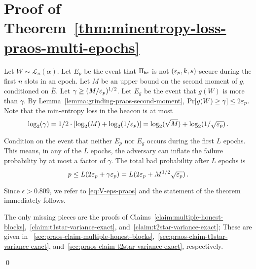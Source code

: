 \section{Proof of Theorem~\ref{thm:minentropy-loss-praos-multi-epochs}}\label{sec:thm-praos-multiepoch}\label{sec:proof-praos-theorem}

Let $W \sim \mathcal{L}_n(\alpha)$. 
Let $E_p$ be the event that 
$\Pi_\mathsf{bc}$ is not $(\mathsf{\varepsilon}_p, k, s)$-secure during 
the first $n$ slots in an epoch. 
Let $M$ be an upper bound on the second moment of $g$, 
conditioned on $\overline{E}$. 
Let $\gamma \geq (M/\mathsf{\varepsilon}_p)^{1/2}$. 
Let $E_g$ be the event that $g(W)$ is more than $\gamma$.
By Lemma~\ref{lemma:grinding-praos-second-moment}, 
$\Pr[g(W) \geq \gamma] \leq 2 \mathsf{\varepsilon}_p$. 
Note that the min-entropy loss in the beacon is at most 
\begin{equation}\label{eq:log-gamma}
 \log_2(\gamma) 
 = 1/2 \cdot [\log_2(M) + \log_2(1/\mathsf{\varepsilon}_p)]
 = \log_2(\sqrt{M}) + \log_2(1/\sqrt{\mathsf{\varepsilon}_p})
 \,. 
\end{equation}


Condition on the event that neither $E_p$ nor $E_g$ 
occurs during the first $L$ epochs. 
This means, in any of the $L$ epochs, 
the adversary can inflate the failure probability 
by at most a factor of $\gamma$.
The total bad probability after $L$ epochs is
$$
  p
  \leq L (2 \mathsf{\varepsilon}_p + \gamma \mathsf{\varepsilon}_p)
  = L (2 \mathsf{\varepsilon}_p + M^{1/2} \sqrt{\mathsf{\varepsilon}_p})
  \,.
$$

Since $\epsilon > 0.809$, we refer to \eqref{eq:V-eps-praos} 
and the statement of the theorem immediately follows.

The only missing pieces are 
the proofs of Claims~\ref{claim:multiple-honest-blocks},~\ref{claim:t1star-variance-exact}, 
and~\ref{claim:t2star-variance-exact}; 
These are given in \Section~\ref{sec:praos-claim-multiple-honest-blocks},~\ref{sec:praos-claim-t1star-variance-exact}, and~\ref{sec:praos-claim-t2star-variance-exact}, respectively. 

\hfill\qed









